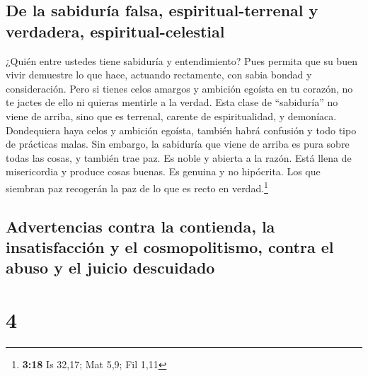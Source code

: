 \hypertarget{de-la-sabiduruxeda-falsa-espiritual-terrenal-y-verdadera-espiritual-celestial}{%
\subsection{De la sabiduría falsa, espiritual-terrenal y verdadera,
espiritual-celestial}\label{de-la-sabiduruxeda-falsa-espiritual-terrenal-y-verdadera-espiritual-celestial}}

 ¿Quién entre ustedes tiene sabiduría y entendimiento?
Pues permita que su buen vivir demuestre lo que hace, actuando
rectamente, con sabia bondad y consideración.  Pero si
tienes celos amargos y ambición egoísta en tu corazón, no te jactes de
ello ni quieras mentirle a la verdad.  Esta clase de
``sabiduría'' no viene de arriba, sino que es terrenal, carente de
espiritualidad, y demoníaca.  Dondequiera haya celos y
ambición egoísta, también habrá confusión y todo tipo de prácticas
malas.  Sin embargo, la sabiduría que viene de arriba es
pura sobre todas las cosas, y también trae paz. Es noble y abierta a la
razón. Está llena de misericordia y produce cosas buenas. Es genuina y
no hipócrita.  Los que siembran paz recogerán la paz de
lo que es recto en verdad.\footnote{\textbf{3:18} Is 32,17; Mat 5,9; Fil
  1,11}

\hypertarget{advertencias-contra-la-contienda-la-insatisfacciuxf3n-y-el-cosmopolitismo-contra-el-abuso-y-el-juicio-descuidado}{%
\subsection{Advertencias contra la contienda, la insatisfacción y el
cosmopolitismo, contra el abuso y el juicio
descuidado}\label{advertencias-contra-la-contienda-la-insatisfacciuxf3n-y-el-cosmopolitismo-contra-el-abuso-y-el-juicio-descuidado}}

\hypertarget{section-3}{%
\section{4}\label{section-3}}

